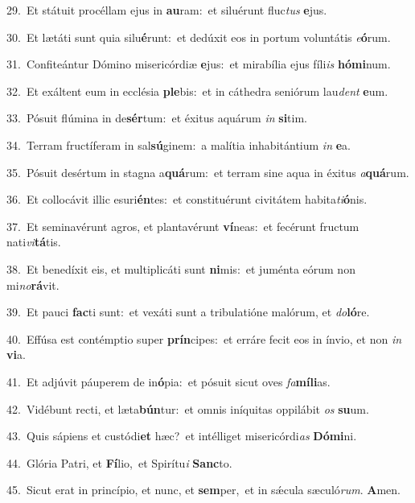 {\numbfont\textcolor{\numbcolor}{29.}}~Et státuit procéllam ejus in \textbf{au}\-ram:~\star et siluérunt fluc\textit{tus} \textbf{e}\-jus.\par
{\numbfont\textcolor{\numbcolor}{30.}}~Et lætáti sunt quia silu\-\textbf{é}\-runt:~\star et dedúxit eos in portum voluntátis \textit{e}\-\textbf{ó}rum.\par
{\numbfont\textcolor{\numbcolor}{31.}}~Confiteántur Dómino misericórdiæ \textbf{e}\-jus:~\star et mirabília ejus fíli\textit{is} \textbf{hó}\-\textbf{mi}num.\par
{\numbfont\textcolor{\numbcolor}{32.}}~Et exáltent eum in ecclésia \textbf{ple}\-bis:~\star et in cáthedra seniórum lau\textit{dent} \textbf{e}\-um.\par
{\numbfont\textcolor{\numbcolor}{33.}}~Pósuit flúmina in de\-\textbf{sér}\-tum:~\star et éxitus aquárum \textit{in} \textbf{si}\-tim.\par
{\numbfont\textcolor{\numbcolor}{34.}}~Terram fructíferam in sal\-\textbf{sú}\-ginem:~\star a malítia inhabitántium \textit{in} \textbf{e}\-a.\par
{\numbfont\textcolor{\numbcolor}{35.}}~Pósuit desértum in stagna a\-\textbf{quá}\-rum:~\star et terram sine aqua in éxitus \textit{a}\-\textbf{quá}rum.\par
{\numbfont\textcolor{\numbcolor}{36.}}~Et collocávit illic esuri\-\textbf{én}\-tes:~\star et constituérunt civitátem habita\-\textit{ti}\-\textbf{ó}nis.\par
{\numbfont\textcolor{\numbcolor}{37.}}~Et seminavérunt agros, et plantavérunt \textbf{ví}\-neas:~\star et fecérunt fructum nati\-\textit{vi}\-\textbf{tá}tis.\par
{\numbfont\textcolor{\numbcolor}{38.}}~Et benedíxit eis, et multiplicáti sunt \textbf{ni}\-mis:~\star et juménta eórum non mi\-\textit{no}\-\textbf{rá}vit.\par
{\numbfont\textcolor{\numbcolor}{39.}}~Et pauci \textbf{fac}\-ti sunt:~\star et vexáti sunt a tribulatióne malórum, et \textit{do}\-\textbf{ló}re.\par
{\numbfont\textcolor{\numbcolor}{40.}}~Effúsa est contémptio super \textbf{prín}\-cipes:~\star et erráre fecit eos in ínvio, et non \textit{in} \textbf{vi}\-a.\par
{\numbfont\textcolor{\numbcolor}{41.}}~Et adjúvit páuperem de in\-\textbf{ó}\-pia:~\star et pósuit sicut oves \textit{fa}\-\textbf{mí}\textbf{li}as.\par
{\numbfont\textcolor{\numbcolor}{42.}}~Vidébunt recti, et læta\-\textbf{bún}\-tur:~\star et omnis iníquitas oppilábit \textit{os} \textbf{su}\-um.\par
{\numbfont\textcolor{\numbcolor}{43.}}~Quis sápiens et custódi\textbf{et} hæc?~\star et intélliget misericórdi\textit{as} \textbf{Dó}\-\textbf{mi}ni.\par
{\numbfont\textcolor{\numbcolor}{44.}}~Glória Patri, et \textbf{Fí}\-lio,~\star et Spirítu\textit{i} \textbf{Sanc}\-to.\par
{\numbfont\textcolor{\numbcolor}{45.}}~Sicut erat in princípio, et nunc, et \textbf{sem}\-per,~\star et in sǽcula sæculó\-\textit{rum}\-. \textbf{A}\-men.\par

